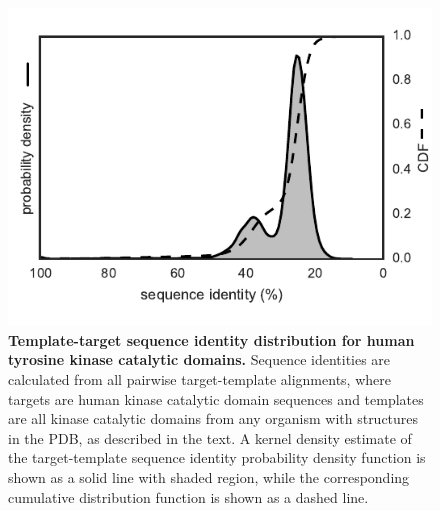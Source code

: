 \documentclass[aps,pre,twocolumn,nofootinbib,superscriptaddress,linenumbers]{revtex4-1}
\begin{document}
\begin{figure}[tb]
    \includegraphics[width=1.0\columnwidth]{seqid_dist/seqid_dist.pdf}

    \caption{{\bf Template-target sequence identity distribution for human tyrosine kinase catalytic domains.}
    Sequence identities are calculated from all pairwise target-template alignments, where targets are human kinase catalytic domain sequences and templates are all kinase catalytic domains from any organism with structures in the PDB, as described in the text.
    A kernel density estimate of the target-template sequence identity probability density function is shown as a solid line with shaded region, while the corresponding cumulative distribution function is shown as a dashed line.
    }
  \label{figure:sequence-identity-distribution}
\end{figure}

\end{document}
